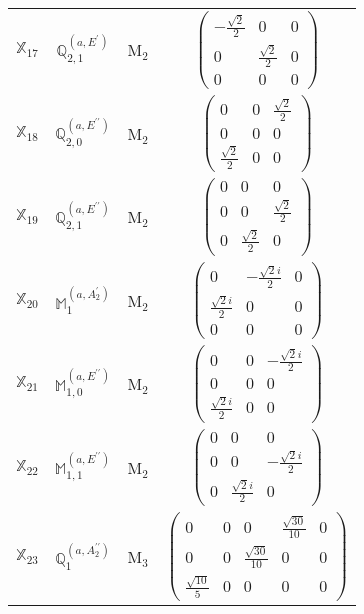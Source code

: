\documentclass[fleqn,10pt,landscape]{article}
\begin{document}
\begin{itemize}
\begin{center}
\begin{longtable}{c|c|c|c}
$ \mathbb{X}_{17} $ & $\mathbb{Q}_{2,1}^{(a,E^{\prime})}$ & M$_{2}$ & $\begin{pmatrix} - \frac{\sqrt{2}}{2} & 0 & 0 \\ 0 & \frac{\sqrt{2}}{2} & 0 \\ 0 & 0 & 0 \end{pmatrix}$ \\
$ \mathbb{X}_{18} $ & $\mathbb{Q}_{2,0}^{(a,E^{\prime\prime})}$ & M$_{2}$ & $\begin{pmatrix} 0 & 0 & \frac{\sqrt{2}}{2} \\ 0 & 0 & 0 \\ \frac{\sqrt{2}}{2} & 0 & 0 \end{pmatrix}$ \\
$ \mathbb{X}_{19} $ & $\mathbb{Q}_{2,1}^{(a,E^{\prime\prime})}$ & M$_{2}$ & $\begin{pmatrix} 0 & 0 & 0 \\ 0 & 0 & \frac{\sqrt{2}}{2} \\ 0 & \frac{\sqrt{2}}{2} & 0 \end{pmatrix}$ \\
$ \mathbb{X}_{20} $ & $\mathbb{M}_{1}^{(a,A_{2}^{\prime})}$ & M$_{2}$ & $\begin{pmatrix} 0 & - \frac{\sqrt{2} i}{2} & 0 \\ \frac{\sqrt{2} i}{2} & 0 & 0 \\ 0 & 0 & 0 \end{pmatrix}$ \\
$ \mathbb{X}_{21} $ & $\mathbb{M}_{1,0}^{(a,E^{\prime\prime})}$ & M$_{2}$ & $\begin{pmatrix} 0 & 0 & - \frac{\sqrt{2} i}{2} \\ 0 & 0 & 0 \\ \frac{\sqrt{2} i}{2} & 0 & 0 \end{pmatrix}$ \\
$ \mathbb{X}_{22} $ & $\mathbb{M}_{1,1}^{(a,E^{\prime\prime})}$ & M$_{2}$ & $\begin{pmatrix} 0 & 0 & 0 \\ 0 & 0 & - \frac{\sqrt{2} i}{2} \\ 0 & \frac{\sqrt{2} i}{2} & 0 \end{pmatrix}$ \\ \hline
$ \mathbb{X}_{23} $ & $\mathbb{Q}_{1}^{(a,A_{2}^{\prime\prime})}$ & M$_{3}$ & $\begin{pmatrix} 0 & 0 & 0 & \frac{\sqrt{30}}{10} & 0 \\ 0 & 0 & \frac{\sqrt{30}}{10} & 0 & 0 \\ \frac{\sqrt{10}}{5} & 0 & 0 & 0 & 0 \end{pmatrix}$ \\

\end{longtable}
\end{center}
\end{itemize}
\end{document}
